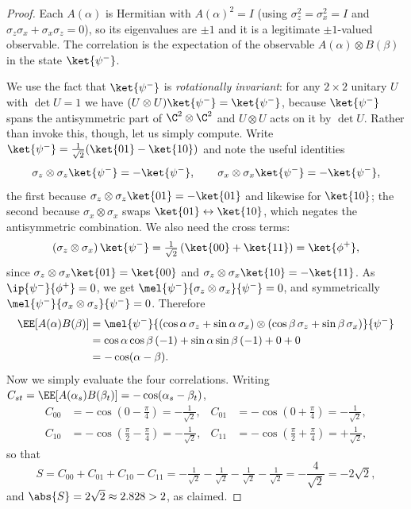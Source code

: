 \begin{proof}
	Each $A(\alpha)$ is Hermitian with $A(\alpha)^2 = I$ (using $\sigma_z^2 = \sigma_x^2 = I$ and $\sigma_z\sigma_x + \sigma_x\sigma_z = 0$), so its eigenvalues are $\pm1$ and it is a legitimate $\pm1$-valued observable. The correlation is the expectation of the observable $A(\alpha)\otimes B(\beta)$ in the state $\ket{\psi^-}$.

	We use the fact that $\ket{\psi^-}$ is \emph{rotationally invariant}: for any $2\times2$ unitary $U$ with $\det U = 1$ we have $(U \otimes U)\ket{\psi^-} = \ket{\psi^-}$, because $\ket{\psi^-}$ spans the antisymmetric part of $\C^2\otimes\C^2$ and $U \otimes U$ acts on it by $\det U$. Rather than invoke this, though, let us simply compute. Write $\ket{\psi^-} = \tfrac1{\sqrt2}(\ket{01}-\ket{10})$ and note the useful identities
	$$\sigma_z\otimes\sigma_z\ket{\psi^-} = -\ket{\psi^-}, \qquad \sigma_x\otimes\sigma_x\ket{\psi^-} = -\ket{\psi^-},$$
	the first because $\sigma_z\otimes\sigma_z\ket{01} = -\ket{01}$ and likewise for $\ket{10}$; the second because $\sigma_x\otimes\sigma_x$ swaps $\ket{01}\leftrightarrow\ket{10}$, which negates the antisymmetric combination. We also need the cross terms:
	$$\left(\sigma_z\otimes\sigma_x\right)\ket{\psi^-} = \tfrac1{\sqrt2}\left(\ket{00} + \ket{11}\right) = \ket{\phi^+},$$
	since $\sigma_z\otimes\sigma_x\ket{01} = \ket{00}$ and $\sigma_z\otimes\sigma_x\ket{10} = -\ket{11}$. As $\ip{\psi^-}{\phi^+} = 0$, we get $\mel{\psi^-}{\sigma_z\otimes\sigma_x}{\psi^-} = 0$, and symmetrically $\mel{\psi^-}{\sigma_x\otimes\sigma_z}{\psi^-} = 0$. Therefore
	\begin{align*}
		\EE\!\left[A(\alpha)B(\beta)\right] &= \mel{\psi^-}{\left(\cos\alpha\,\sigma_z + \sin\alpha\,\sigma_x\right)\otimes\left(\cos\beta\,\sigma_z+\sin\beta\,\sigma_x\right)}{\psi^-}\\
		&= \cos\alpha\cos\beta\,(-1) + \sin\alpha\sin\beta\,(-1) + 0 + 0 \\
		&= -\cos(\alpha-\beta).
	\end{align*}
	Now we simply evaluate the four correlations. Writing $C_{st} = \EE[A(\alpha_s)B(\beta_t)] = -\cos(\alpha_s - \beta_t)$,
	\begin{align*}
		C_{00} &= -\cos\!\left(0 - \tfrac\pi4\right) = -\tfrac{1}{\sqrt2}, &
		C_{01} &= -\cos\!\left(0 + \tfrac\pi4\right) = -\tfrac1{\sqrt2},\\
		C_{10} &= -\cos\!\left(\tfrac\pi2-\tfrac\pi4\right) = -\tfrac1{\sqrt2}, &
		C_{11} &= -\cos\!\left(\tfrac\pi2+\tfrac\pi4\right) = +\tfrac1{\sqrt2},
	\end{align*}
	so that
	$$S = C_{00}+C_{01}+C_{10}-C_{11} = -\tfrac{1}{\sqrt2}-\tfrac1{\sqrt2}-\tfrac1{\sqrt2}-\tfrac1{\sqrt2} = -\frac{4}{\sqrt2} = -2\sqrt2,$$
	and $\abs{S} = 2\sqrt2 \approx 2.828 > 2$, as claimed.
\end{proof}

